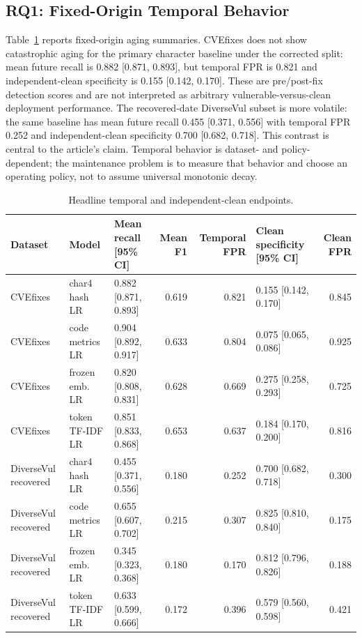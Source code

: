\documentclass[a4paper,fleqn]{cas-dc}
\begin{document}
\subsection{RQ1: Fixed-Origin Temporal Behavior}

Table~\ref{tab:aging} reports fixed-origin aging summaries. CVEfixes does not
show catastrophic aging for the primary character baseline under the
corrected split: mean future recall is 0.882 [0.871, 0.893], but temporal FPR
is 0.821 and independent-clean specificity is 0.155 [0.142, 0.170].
These are pre/post-fix detection scores and are not interpreted as arbitrary
vulnerable-versus-clean deployment performance.
The recovered-date DiverseVul subset is more volatile: the same baseline has
mean future recall 0.455 [0.371, 0.556] with temporal FPR 0.252 and
independent-clean specificity 0.700 [0.682, 0.718]. This contrast is central to
the article's claim. Temporal behavior is dataset- and policy-dependent; the
maintenance problem is to measure that behavior and choose an operating policy,
not to assume universal monotonic decay.

\begin{table}
\centering
\caption{Headline temporal and independent-clean endpoints.}
\label{tab:aging}
\small
\setlength{\tabcolsep}{4pt}
\begin{tabular}{llp{}rrp{}r}
\toprule
Dataset & Model & Mean recall [95\% CI] & Mean F1 & Temporal FPR &
Clean specificity [95\% CI] & Clean FPR \\
\midrule
CVEfixes & char4 hash LR & 0.882 [0.871, 0.893] & 0.619 & 0.821 & 0.155 [0.142, 0.170] & 0.845 \\
CVEfixes & code metrics LR & 0.904 [0.892, 0.917] & 0.633 & 0.804 & 0.075 [0.065, 0.086] & 0.925 \\
CVEfixes & frozen emb. LR & 0.820 [0.808, 0.831] & 0.628 & 0.669 & 0.275 [0.258, 0.293] & 0.725 \\
CVEfixes & token TF-IDF LR & 0.851 [0.833, 0.868] & 0.653 & 0.637 & 0.184 [0.170, 0.200] & 0.816 \\
\midrule
DiverseVul recovered & char4 hash LR & 0.455 [0.371, 0.556] & 0.180 & 0.252 & 0.700 [0.682, 0.718] & 0.300 \\
DiverseVul recovered & code metrics LR & 0.655 [0.607, 0.702] & 0.215 & 0.307 & 0.825 [0.810, 0.840] & 0.175 \\
DiverseVul recovered & frozen emb. LR & 0.345 [0.323, 0.368] & 0.180 & 0.170 & 0.812 [0.796, 0.826] & 0.188 \\
DiverseVul recovered & token TF-IDF LR & 0.633 [0.599, 0.666] & 0.172 & 0.396 & 0.579 [0.560, 0.598] & 0.421 \\
\bottomrule
\end{tabular}
\end{table}
\end{document}
